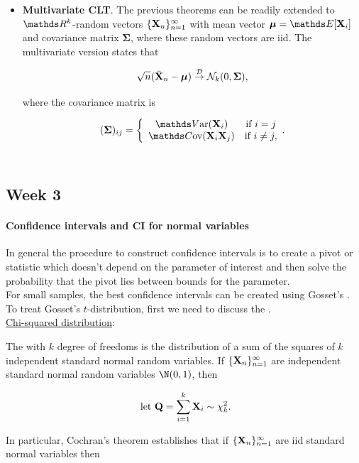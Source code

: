 \documentclass{homework}
\begin{document}
\begin{itemize}
   \item \textbf{Multivariate CLT}. The previous theorems can be readily extended to $\R^k$-random vectors $\{{\bf X}_n\}_{n=1}^{\infty}$ with mean vector $\bm{\mu}=\E[\X_i]$ and covariance matrix $\bm{\Sigma}$, where these random vectors are iid. The multivariate version states that 
   
   $$
   \sqrt{n}(\bar{{\bf X}}_n - \bm{\mu}) \overset{\mathcal{D}}{\rightarrow} \mathcal{N}_k (0, \bm{\Sigma}),
   $$
   
   where the covariance matrix is 
   
   $$
   (\bm{\Sigma})_{ij} = \bigg\{ \begin{array}{ccc}
       \var(\X_i)  & \textnormal{if } i=j  \\
       \cov(\X_i \X_j)  & \textnormal{if } i \neq j, 
    \end{array}.
   $$ \\
\end{itemize}

\subsection{Week 3}

\paragraph{\textbf{Confidence intervals and CI for normal variables }}

In general the procedure to construct confidence intervals is to create a pivot or statistic which doesn't depend on the parameter of interest and then solve the probability that the pivot lies between bounds for the parameter. \\
For small samples, the best confidence intervals can be created using Gosset's \tdis. To treat Gosset's $t$-distribution, first we need to discuss the \chidis. \\

\underline{Chi-squared distribution}: 

The \chidis with $k$ degree of freedoms is the distribution of a sum of the squares of $k$ independent standard normal random variables. If $\{{\bf X}_n\}_{n=1}^{\infty}$ are independent standard normal random variables $\N(0, 1)$, then 

$$
\textnormal{ let } {\bf Q} = \sum_{i=1}^{k} {\bf X}_i \sim \chi^2_k.
$$

In particular, Cochran's theorem establishes that if $\{{\bf X}_n\}_{n=1}^{\infty}$ are iid standard normal variables then
\end{document}
